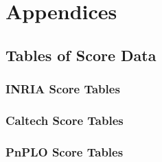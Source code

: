 \appendix
\section{Appendices}
%
\subsection{Tables of Score Data}\label{appendix:tables_of_data}
\newpage
\subsubsection{INRIA Score Tables}
% 
\subsubsection{Caltech Score Tables}
% 
\subsubsection{PnPLO Score Tables}
% 
